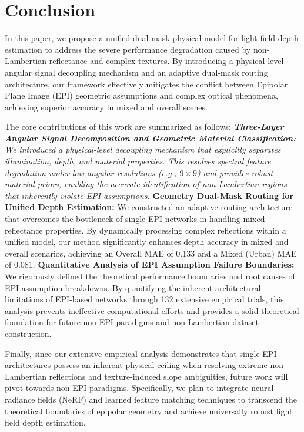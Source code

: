\section{Conclusion}


In this paper, we propose a unified dual-mask physical model for light field depth estimation to address the severe performance degradation caused by non-Lambertian reflectance and complex textures. By introducing a physical-level angular signal decoupling mechanism and an adaptive dual-mask routing architecture, our framework effectively mitigates the conflict between Epipolar Plane Image (EPI) geometric assumptions and complex optical phenomena, achieving superior accuracy in mixed and overall scenes.

The core contributions of this work are summarized as follows:
\textit{ \textbf{Three-Layer Angular Signal Decomposition and Geometric Material Classification:} We introduced a physical-level decoupling mechanism that explicitly separates illumination, depth, and material properties. This resolves spectral feature degradation under low angular resolutions (e.g., $9 \times 9$) and provides robust material priors, enabling the accurate identification of non-Lambertian regions that inherently violate EPI assumptions.
} \textbf{Geometry Dual-Mask Routing for Unified Depth Estimation:} We constructed an adaptive routing architecture that overcomes the bottleneck of single-EPI networks in handling mixed reflectance properties. By dynamically processing complex reflections within a unified model, our method significantly enhances depth accuracy in mixed and overall scenarios, achieving an Overall MAE of 0.133 and a Mixed (Urban) MAE of 0.081.
\textbf{Quantitative Analysis of EPI Assumption Failure Boundaries:} We rigorously defined the theoretical performance boundaries and root causes of EPI assumption breakdowns. By quantifying the inherent architectural limitations of EPI-based networks through 132 extensive empirical trials, this analysis prevents ineffective computational efforts and provides a solid theoretical foundation for future non-EPI paradigms and non-Lambertian dataset construction.

Finally, since our extensive empirical analysis demonstrates that single EPI architectures possess an inherent physical ceiling when resolving extreme non-Lambertian reflections and texture-induced slope ambiguities, future work will pivot towards non-EPI paradigms. Specifically, we plan to integrate neural radiance fields (NeRF) and learned feature matching techniques to transcend the theoretical boundaries of epipolar geometry and achieve universally robust light field depth estimation.


